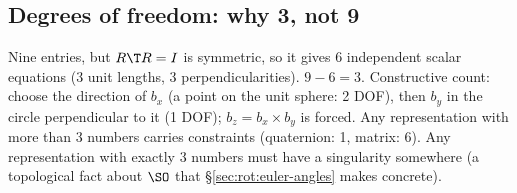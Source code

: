 \subsection{Degrees of freedom: why 3, not 9}\label{sec:rot:degrees-freedom-3}
Nine entries, but $R\T R=I$ is symmetric, so it gives $6$ independent scalar equations (3 unit lengths, 3 perpendicularities). $9-6=3$. Constructive count: choose the direction of $b_x$ (a point on the unit sphere: 2 DOF), then $b_y$ in the circle perpendicular to it (1 DOF); $b_z=b_x\times b_y$ is forced. Any representation with more than 3 numbers carries constraints (quaternion: 1, matrix: 6). Any representation with exactly 3 numbers must have a singularity somewhere (a topological fact about $\SO$ that \S\ref{sec:rot:euler-angles} makes concrete).
